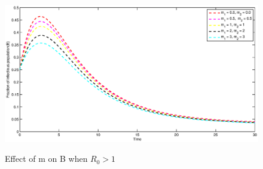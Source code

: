 \begin{flushleft}
\begin{figure}[h!]
\centering
  \includegraphics[width=7.5in]{mB2.eps}\\
  \caption{Effect of m on B when $R_0>1$}\label{fig:b2}
\end{figure}
\end{flushleft}

